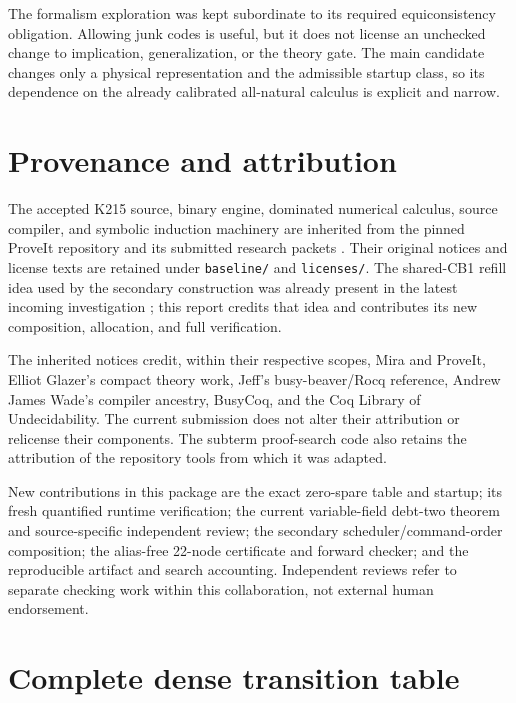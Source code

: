 \documentclass[11pt,letterpaper]{article}
\theoremstyle{definition}
\newcommand{\pathfile}[1]{\texttt{\nolinkurl{#1}}}
\begin{document}
The formalism exploration was kept subordinate to its required
equiconsistency obligation.  Allowing junk codes is useful, but it
does not license an unchecked change to implication, generalization,
or the theory gate.  The main candidate changes only a physical
representation and the admissible startup class, so its dependence on
the already calibrated all-natural calculus is explicit and narrow.

\section{Provenance and attribution}
\label{sec:provenance}

The accepted K215 source, binary engine, dominated numerical calculus,
source compiler, and symbolic induction machinery are inherited from
the pinned ProveIt repository and its submitted research packets
\cite{repo,k215,dominated,permuted}.  Their original notices and license
texts are retained under \pathfile{baseline/} and \pathfile{licenses/}.
The shared-CB1 refill idea used by the secondary construction was
already present in the latest incoming investigation
\cite{investigation}; this report credits that idea and contributes its
new composition, allocation, and full verification.

The inherited notices credit, within their respective scopes, Mira and
ProveIt, Elliot Glazer's compact theory work, Jeff's busy-beaver/Rocq
reference, Andrew James Wade's compiler ancestry, BusyCoq, and the Coq
Library of Undecidability.  The current submission does not alter their
attribution or relicense their components.  The subterm proof-search
code also retains the attribution of the repository tools from which
it was adapted.

New contributions in this package are the exact zero-spare table and
startup; its fresh quantified runtime verification; the current
variable-field debt-two theorem and source-specific independent review;
the secondary scheduler/command-order composition; the alias-free
22-node certificate and forward checker; and the reproducible artifact
and search accounting.  Independent reviews refer to separate checking
work within this collaboration, not external human endorsement.

\clearpage
\appendix
\section{Complete dense transition table}
\label{app:table}
\end{document}
